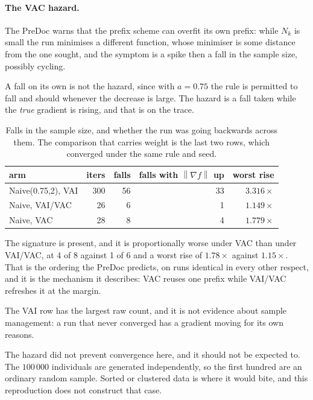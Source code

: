 \documentclass[11pt,a4paper]{article}
\providecommand{\norm}[1]{\left \lVert #1 \right \rVert}
\newcommand{\VAI}{\textsf{VAI}}
\newcommand{\VAIVAC}{\textsf{VAI/VAC}}
\newcommand{\VAC}{\textsf{VAC}}
\begin{document}
\paragraph{The \VAC{} hazard.} The PreDoc warns that the prefix scheme can overfit
its own prefix: while $N_k$ is small the run minimises a different function, whose
minimiser is some distance from the one sought, and the symptom is a spike then a
fall in the sample size, possibly cycling.

A fall on its own is not the hazard, since with $a = 0.75$ the rule is permitted to
fall and should whenever the decrease is large. The hazard is a fall taken while the
\emph{true} gradient is rising, and that is on the trace.

\begin{table}[H]
\centering
\caption{Falls in the sample size, and whether the run was going backwards across
them. The comparison that carries weight is the last two rows, which converged
under the same rule and seed.}
\label{tab:hazard}
\begin{tabular}{lrrrr}
\toprule
arm & iters & falls & falls with $\norm{\nabla f}$ up & worst rise \\
\midrule
Naive(0.75,2), \VAI{} & 300 & 56 & 33 & $3.316\times$ \\
Naive, \VAIVAC{}      &  26 &  6 &  1 & $1.149\times$ \\
Naive, \VAC{}         &  28 &  8 &  4 & $1.779\times$ \\
\bottomrule
\end{tabular}
\end{table}

The signature is present, and it is proportionally worse under \VAC{} than under
\VAIVAC{}, at 4 of 8 against 1 of 6 and a worst rise of $1.78\times$ against
$1.15\times$. That is the ordering the PreDoc predicts, on runs identical in every
other respect, and it is the mechanism it describes: \VAC{} reuses one prefix while
\VAIVAC{} refreshes it at the margin.

The \VAI{} row has the largest raw count, and it is not evidence about sample
management: a run that never converged has a gradient moving for its own reasons.

The hazard did not prevent convergence here, and it should not be expected to. The
$100\,000$ individuals are generated independently, so the first hundred are an
ordinary random sample. Sorted or clustered data is where it would bite, and this
reproduction does not construct that case.
\end{document}
